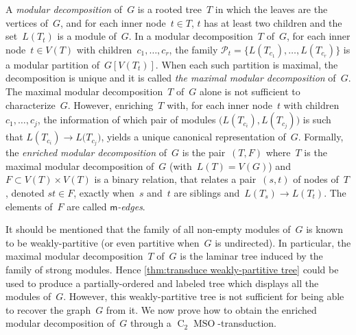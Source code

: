 \documentclass{lmcs} %
\newcommand*\defd[2][\em\color{red!25!black}]{{#1#2}}
\newcommand*{\fullsucc}[3][\to]{\ensuremath{#2\text{$#1$}#3}}
\newcommand{\MSO}{\ensuremath{\operatorname{MSO}}\xspace}
\newcommand{\CMSO}[1][]{\ensuremath{\C[#1]{\!\!}\MSO}\xspace}
\newcommand{\C}[1][]{\ensuremath{\operatorname{C}_{#1}}\xspace}
\begin{document}
A \defd{modular decomposition} of~$G$
is a rooted tree~$T$
in which the leaves are the vertices of~$G$,
and for each inner node~$t\in T$,
$t$ has at least two children
and the set~$L(T_t)$ is a module of~$G$.
%
In a modular decomposition~$T$ of~$G$,
for each inner node~$t\in V(T)$
with children~$c_1,\ldots,c_r$,
the family $\mathcal{P}_t=\{L(T_{c_1}),\ldots,L(T_{c_r})\}$
is a modular partition of~$G[V(T_t)]$.
When each such partition is maximal,
the decomposition is unique
and it is called \defd{the maximal modular decomposition} of~$G$.
The maximal modular decomposition~$T$ of~$G$ alone
is not sufficient to characterize~$G$.
However, enriching~$T$ with,
for each inner node~$t$ with children~$c_1,\ldots,c_j$,
the information of which pair of modules $\big(L(T_{c_i}),L(T_{c_j})\big)$
is such that $\fullsucc{L(T_{c_i})}{L(T_{c_j}})$,
yields a unique canonical representation of~$G$.
Formally, the \defd{enriched modular decomposition} of~$G$
is the pair~$(T,F)$
where~$T$ is the maximal modular decomposition of~$G$ (with~$L(T)=V(G)$)
and~$F\subset V(T)\times V(T)$
is a binary relation,
that relates a pair~$(s,t)$ of nodes of~$T$,
denoted $st\in F$,
exactly when~$s$ and~$t$ are siblings and~$\fullsucc{L(T_s)}{L(T_t)}$.
The elements of~$F$ are called \defd{$\mathsf{m}$-edges}.

It should be mentioned that the family of all non-empty modules of~$G$
is known to be weakly-partitive (or even partitive when~$G$ is undirected).
In particular, the maximal modular decomposition~$T$ of~$G$
is the laminar tree induced by the family of strong modules.
Hence \autoref{thm:transduce weakly-partitive tree}
could be used to produce a partially-ordered and labeled tree which displays all the modules of~$G$.
However, this weakly-partitive tree is not sufficient
for being able to recover the graph~$G$ from it.
We now prove how to obtain the enriched modular decomposition of~$G$
through a \CMSO[2]-transduction.
\end{document}
